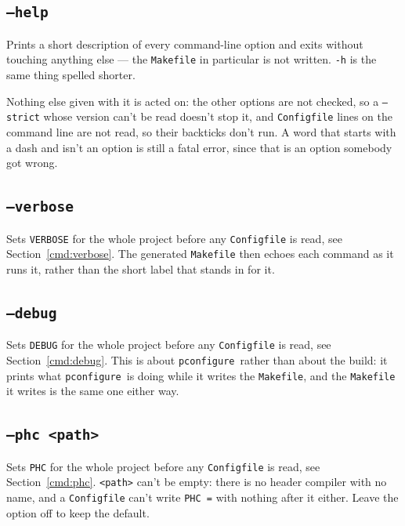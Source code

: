 \documentclass{article}
\newcommand{\pconfigure}{\texttt{pconfigure}}
\begin{document}
\subsection{\texttt{--help} \label{cl:help}}

Prints a short description of every command-line option and exits
without touching anything else --- the \texttt{Makefile} in particular
is not written.  \texttt{-h} is the same thing spelled shorter.

Nothing else given with it is acted on: the other options are not
checked, so a \texttt{--strict} whose version can't be read doesn't
stop it, and \texttt{Configfile} lines on the command line are not
read, so their backticks don't run.  A word that starts with a dash and
isn't an option is still a fatal error, since that is an option
somebody got wrong.

\subsection{\texttt{--verbose} \label{cl:verbose}}

Sets \texttt{VERBOSE} for the whole project before any
\texttt{Configfile} is read, see Section~\ref{cmd:verbose}.  The
generated \texttt{Makefile} then echoes each command as it runs it,
rather than the short label that stands in for it.

\subsection{\texttt{--debug} \label{cl:debug}}

Sets \texttt{DEBUG} for the whole project before any
\texttt{Configfile} is read, see Section~\ref{cmd:debug}.  This is
about \pconfigure\ rather than about the build: it prints what
\pconfigure\ is doing while it writes the \texttt{Makefile}, and the
\texttt{Makefile} it writes is the same one either way.

\subsection{\texttt{--phc <path>} \label{cl:phc}}

Sets \texttt{PHC} for the whole project before any \texttt{Configfile}
is read, see Section~\ref{cmd:phc}.
\texttt{<path>} can't be empty: there is no header compiler with no
name, and a \texttt{Configfile} can't write \texttt{PHC =} with
nothing after it either.  Leave the option off to keep the default.
\end{document}
